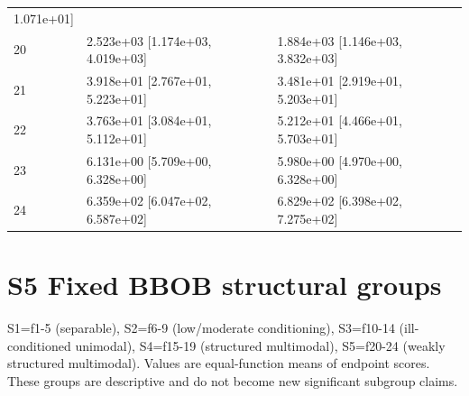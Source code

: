 \documentclass[11pt,a4paper]{article}
\begin{document}
\begin{minipage}{\linewidth}
\begin{longtable}[]{@{}lll@{}}
1.071e+01{]} \\
20 & 2.523e+03 {[}1.174e+03, 4.019e+03{]} & 1.884e+03 {[}1.146e+03,
3.832e+03{]} \\
21 & 3.918e+01 {[}2.767e+01, 5.223e+01{]} & 3.481e+01 {[}2.919e+01,
5.203e+01{]} \\
22 & 3.763e+01 {[}3.084e+01, 5.112e+01{]} & 5.212e+01 {[}4.466e+01,
5.703e+01{]} \\
23 & 6.131e+00 {[}5.709e+00, 6.328e+00{]} & 5.980e+00 {[}4.970e+00,
6.328e+00{]} \\
24 & 6.359e+02 {[}6.047e+02, 6.587e+02{]} & 6.829e+02 {[}6.398e+02,
7.275e+02{]} \\
\bottomrule
\end{longtable}

\end{minipage}\par

\newpage

\hypertarget{s5-fixed-bbob-structural-groups}{%
\section{S5 Fixed BBOB structural
groups}\label{s5-fixed-bbob-structural-groups}}

S1=f1-5 (separable), S2=f6-9 (low/moderate conditioning), S3=f10-14
(ill-conditioned unimodal), S4=f15-19 (structured multimodal), S5=f20-24
(weakly structured multimodal). Values are equal-function means of
endpoint scores. These groups are descriptive and do not become new
significant subgroup claims.
\end{document}
